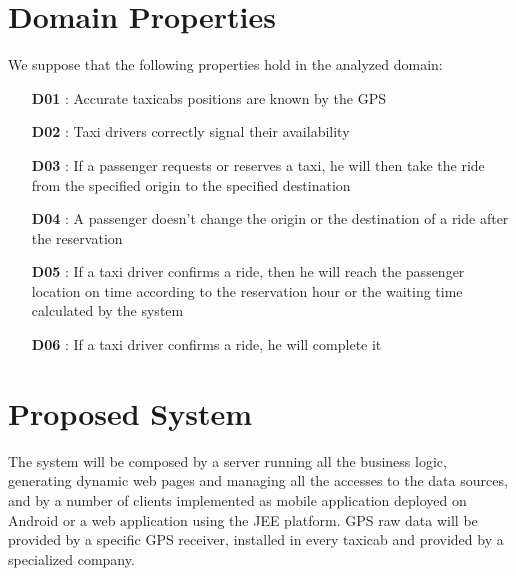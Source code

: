 \section{Domain Properties}
\noindent We suppose that the following properties hold in the analyzed domain:
\begin{itemize}
	\item [\textbf{D01}] : Accurate taxicabs positions are known by the GPS
	\item [\textbf{D02}] : Taxi drivers correctly signal their availability
	\item [\textbf{D03}] : If a passenger requests or reserves a taxi, he will then take the ride from the specified origin to the specified destination
	\item [\textbf{D04}] : A passenger doesn't change the origin or the destination of a ride after the reservation
	\item [\textbf{D05}] : If a taxi driver confirms a ride, then he will reach the passenger location on time according to the reservation hour or the waiting time calculated by the system
	\item [\textbf{D06}] : If a taxi driver confirms a ride, he will complete it
\end{itemize}

\section{Proposed System}
The system will be composed by a server running all the business logic, generating dynamic web pages and managing all the accesses to the data sources, and by a number of clients implemented as mobile application deployed on Android or a web application using the JEE platform. GPS raw data will be provided by a specific GPS receiver, installed in every taxicab and provided by a specialized company.

